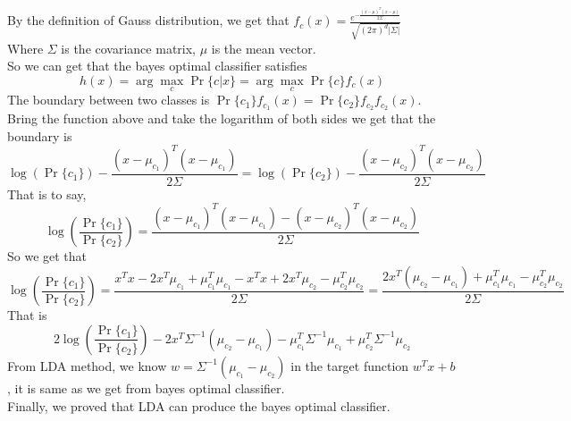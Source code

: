 \begin{solution}
    By the definition of Gauss distribution, we get that $f_{c}(x)=\frac{e^{-\frac{(x-\mu)^{T}(x-\mu)}{2\Sigma}}}{\sqrt{(2\pi)^d|\Sigma|}}$\\
    Where $\Sigma$ is the covariance matrix, $\mu$ is the mean vector.\\
    So we can get that the bayes optimal classifier satisfies \[h(x)=\arg\max_{c}\Pr\{c|x\}=\arg\max_{c}\Pr\{c\}f_{c}(x)\]
    The boundary between two classes is $\Pr\{c_1\}f_{c_{1}}(x)=\Pr\{c_2\}f_{c_2}f_{c_2}(x)$.\\
    Bring the function above and take the logarithm of both sides we get that the boundary is
    \[\log(\Pr\{c_1\})-\frac{(x-\mu_{c_1})^{T}(x-\mu_{c_1})}{2\Sigma} = \log(\Pr\{c_2\})-\frac{(x-\mu_{c_2})^{T}(x-\mu_{c_2})}{2\Sigma}\]
    That is to say,
    \[\log(\frac{\Pr\{c_1\}}{\Pr\{c_2\}})=\frac{(x-\mu_{c_1})^{T}(x-\mu_{c_1})-(x-\mu_{c_2})^{T}(x-\mu_{c_2})}{2\Sigma}\]
    So we get that
    \[\log(\frac{\Pr\{c_1\}}{\Pr\{c_2\}})=\frac{x^{T}x-2x^{T}\mu_{c_1}+\mu_{c_1}^{T}\mu_{c_1}-x^{T}x+2x^{T}\mu_{c_2}-\mu_{c_2}^{T}\mu_{c_2}}{2\Sigma}=\frac{2x^{T}(\mu_{c_2}-\mu_{c_1})+\mu^{T}_{c_1}\mu_{c_1}-\mu^{T}_{c_2}\mu_{c_2}}{2\Sigma}\]
    That is
    \[2\log(\frac{\Pr\{c_1\}}{\Pr\{c_2\}})-2x^{T}\Sigma^{-1}(\mu_{c_2}-\mu_{c_1})-\mu^{T}_{c_1}\Sigma^{-1}\mu_{c_1}+\mu^{T}_{c_2}\Sigma^{-1}\mu_{c_2}\]
    From LDA method, we know $w=\Sigma^{-1}(\mu_{c_1}-\mu_{c_2})$ in the target function $w^{T}x+b$, it is same as we get from bayes optimal classifier.\\
    Finally, we proved that LDA can produce the bayes optimal classifier.
\end{solution}
